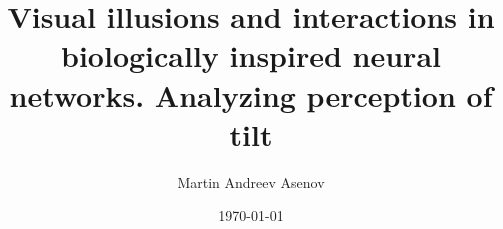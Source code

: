 


\title{Visual illusions and interactions in biologically inspired neural networks. Analyzing perception of tilt}

\author{Martin Andreev Asenov}



\date{\today}


